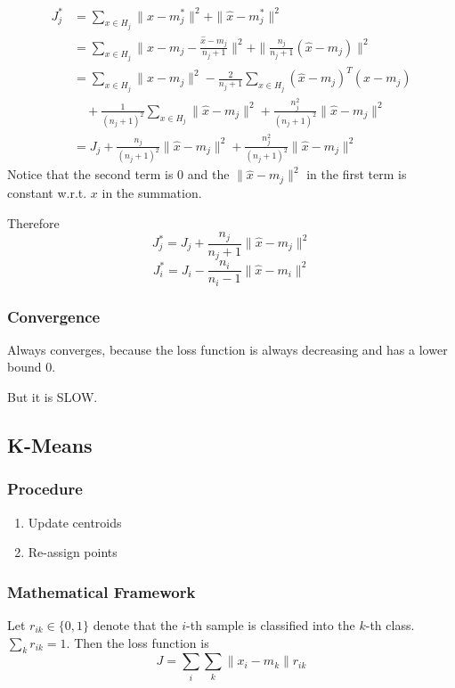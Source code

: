 \begin{align*}
    J_j^* & = \sum_{x\in H_j}\| x-m_j^* \|^2 + \| \hat{x} - m_j^* \|^2                                                \\
          & = \sum_{x\in H_j}\|x-m_j-\frac{\hat{x}-m_j}{n_j+1}\|^2 + \| \frac{n_j}{n_j+1}(\hat{x}-m_j) \|^2           \\
          & = \sum_{x\in H_j} \| x - m_j \|^2 - \frac{2}{n_j+1}\sum_{x\in H_j}(\hat{x}-m_j)^T(x-m_j)                  \\
          & \quad + \frac{1}{(n_j+1)^2}\sum_{x\in H_j}\| \hat{x} -m_j \|^2 + \frac{n_j^2}{(n_j+1)^2}\|\hat{x}-m_j\|^2 \\
          & = J_j + \frac{n_j}{(n_j+1)^2}\|\hat{x}-m_j\|^2 + \frac{n_j^2}{(n_j+1)^2}\|\hat{x}-m_j\|^2
\end{align*}
Notice that the second term is $0$ and the $\|\hat{x}-m_j\|^2$ in the first term is constant w.r.t. $x$ in the summation.

Therefore
\[ J^*_j = J_j + \frac{n_j}{n_j+1}\|\hat{x}-m_j\|^2 \]
\[ J^*_i = J_i - \frac{n_i}{n_i-1}\|\hat{x}-m_i\|^2 \]

\subsubsection{Convergence}
Always converges, because the loss function is always decreasing and has a lower bound $0$.

But it is SLOW.

\subsection{K-Means}
\subsubsection{Procedure}
\begin{enumerate}
    \item Update centroids
    \item Re-assign points
\end{enumerate}

\subsubsection{Mathematical Framework}
Let $r_{ik} \in \{0,1\}$ denote that the $i$-th sample is classified into the $k$-th class. $\sum_kr_{ik} = 1$. Then the loss function is
\[ J = \sum_i \sum_k \| x_i - m_k \|r_{ik} \]


